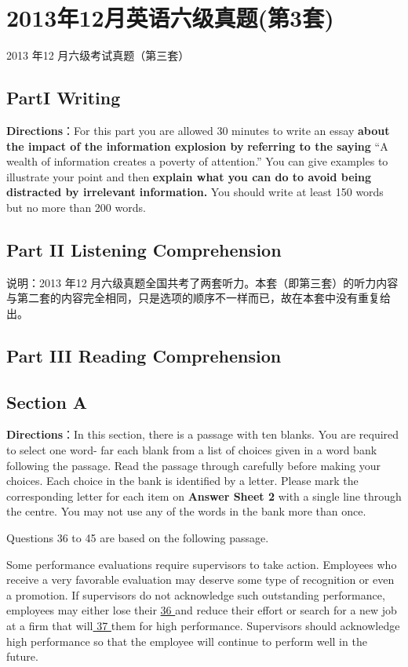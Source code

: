 \documentclass[UTF8,11pt]{ctexart}
\begin{document}
\section*{2013年12月英语六级真题(第3套)}
2013 年12 月六级考试真题（第三套）


\subsection*{\textbf{Part}I \textbf{Writing}}


\textbf{Directions}：For this part you are allowed 30 minutes to write an essay\textbf{ about the impact of the information explosion by} \textbf{referring to the saying} “A wealth of information creates a poverty of attention.” You can give examples to illustrate your point and then\textbf{ explain what you can do to avoid being distracted by irrelevant} \textbf{information.} You should write at least 150 words but no more than 200 words.


\subsection*{\textbf{Part II} \textbf{Listening Comprehension}}


说明：2013 年12 月六级真题全国共考了两套听力。本套（即第三套）的听力内容与第二套的内容完全相同，只是选项的顺序不一样而已，故在本套中没有重复给出。


\subsection*{\textbf{Part III} \textbf{Reading Comprehension}}


\subsection*{Section A}


\textbf{Directions}：In this section, there is a passage with ten blanks. You are required to select one word- far each blank from a list of choices given in a word bank following the passage. Read the passage through carefully before making your choices. Each choice in the bank is identified by a letter. Please mark the corresponding letter for each item on\textbf{ Answer Sheet 2} with a single line through the centre. You may not use any of the words in the bank more than once.


Questions 36 to 45 are based on the following passage.


Some performance evaluations require supervisors to take action. Employees who receive a very favorable evaluation may deserve some type of recognition or even a promotion. If supervisors do not acknowledge such outstanding performance, employees may either lose their \uline{36 }and reduce their effort or search for a new job at a firm that will\uline{ 37 }them for high performance. Supervisors should acknowledge high performance so that the employee will continue to perform well in the future.
\end{document}
